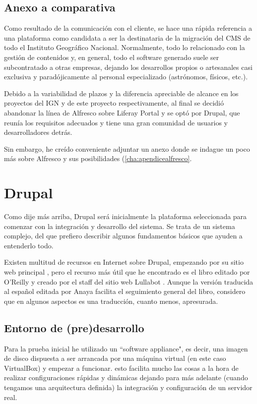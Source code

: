 \subsection{Anexo a comparativa}
\par Como resultado de la comunicación con el cliente, se hace una rápida referencia a una plataforma como candidata a ser la destinataria de la migración del CMS de todo el Instituto Geográfico Nacional. Normalmente, todo lo relacionado con la gestión de contenidos y, en general, todo el software generado suele ser subcontratado a otras empresas, dejando los desarrollos propios o artesanales casi exclusiva y paradójicamente al personal especializado (astrónomos, físicos, etc.).
\par Debido a la variabilidad de plazos y la diferencia apreciable de alcance en los proyectos del IGN y de este proyecto respectivamente, al final se decidió abandonar la línea de Alfresco sobre Liferay Portal y se optó por Drupal, que reunía los requisitos adecuados y tiene una gran comunidad de usuarios y desarrolladores detrás.

\par Sin embargo, he creído conveniente adjuntar un anexo donde se indague un poco más sobre Alfresco y sus posibilidades (\ref{cha:apendicealfresco}.


\section{Drupal}

\par Como dije más arriba, Drupal será inicialmente la plataforma seleccionada para comenzar con la integración y desarrollo del sistema. Se trata de un sistema complejo, del que prefiero describir algunos fundamentos básicos que ayuden a entenderlo todo.

\par Existen multitud de recursos en Internet sobre Drupal, empezando por su sitio web principal \cite{references:drupalhome}, pero el recurso más útil que he encontrado es el libro editado por O'Reilly \cite{ByronBerryHaugEatonWalkerRobbins200812} y creado por el staff del sitio web Lullabot \cite{references:lullabot}. Aunque la versión traducida al español editada por Anaya \cite{ByronBerryHaugEatonWalkerRobbins200909} facilita el seguimiento general del libro, considero que en algunos aspectos es una traducción, cuanto menos, apresurada.

\subsection{Entorno de (pre)desarrollo}
\par Para la prueba inicial he utilizado un ``software appliance", es decir, una imagen de disco dispuesta a ser arrancada por una máquina virtual (en este caso VirtualBox) y empezar a funcionar. esto facilita mucho las cosas a la hora de realizar configuraciones rápidas y dinámicas dejando para más adelante (cuando tengamos una arquitectura definida) la integración y configuración de un servidor real.

